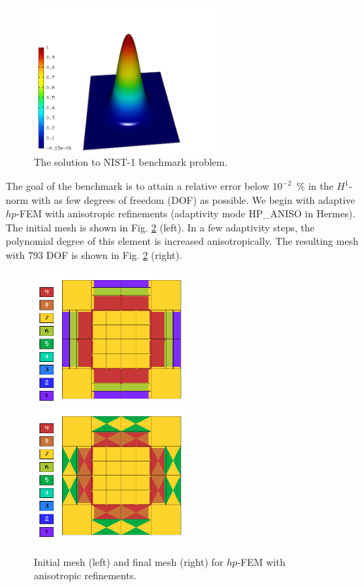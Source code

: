 \documentclass[12pt]{elsarticle}
\begin{document}
\begin{figure}[!ht]
\centering
\includegraphics[height=5.5cm]{nist/nist-1/solution.png}
\caption{The solution to NIST-1 benchmark problem.}
\label{fig:sln-nist01}
\end{figure}
\noindent
The goal of the benchmark is to attain a relative error below
$10^{-2}$~\% in the $H^1$-norm with as few degrees of freedom (DOF)
as possible. 
We begin with adaptive $hp$-FEM with anisotropic refinements (adaptivity mode
HP\_ANISO in {\sc Hermes}). The initial mesh is shown in Fig. \ref{fig:nist-1-hp-aniso} (left).
In a few adaptivity steps, the polynomial degree of this element is increased
anisotropically.
The resulting mesh with 793 DOF is shown in Fig. \ref{fig:nist-1-hp-aniso} (right).

\begin{figure}[!ht]
\centering
\includegraphics[height=5cm]{nist/nist-1/mesh_hp_anisoh.png}\ \
\includegraphics[height=5cm]{nist/nist-1/mesh_hp_aniso.png}
\vspace{-2mm}
\caption{Initial mesh (left) and final mesh (right) for $hp$-FEM with anisotropic refinements.}
\label{fig:nist-1-hp-aniso}
\end{figure}
\end{document}
